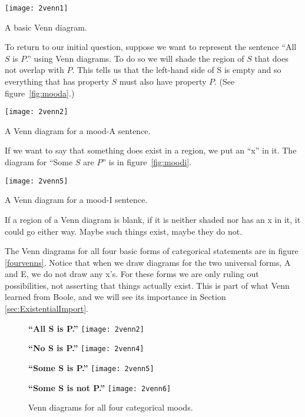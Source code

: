 \begin{marginfigure}
\texttt{[image: 2venn1]}
\caption{A basic Venn diagram.}
\label{fig:basicvenn}
\end{marginfigure}

To return to our initial question, suppose we want to represent the sentence ``All $S$ is $P$.'' using Venn diagrams. To do so we will shade the region of $S$ that does not overlap with $P$. This tells us that the left-hand side of S is empty and so everything that has property $S$ must also have property $P$. (See figure~\ref{fig:mooda}.)

\begin{marginfigure}
\texttt{[image: 2venn2]}
\caption{A Venn diagram for a mood-A sentence.}
\label{fig:mooda}
\end{marginfigure}

If we want to say that something does exist in a region, we put an ``x'' in it. The diagram for ``Some $S$ are $P$'' is in figure~\ref{fig:moodi}.

\begin{marginfigure}
\texttt{[image: 2venn5]}
\caption{A Venn diagram for a mood-I sentence.}
\label{fig:moodi}
\end{marginfigure}


If a region of a Venn diagram is blank, if it is neither shaded nor has an x in it, it could go either way. Maybe such things exist, maybe they do not.

The Venn diagrams for all four basic forms of categorical statements are in figure \ref{fourvenns}. Notice that when we draw diagrams for the two universal forms, A and E, we do not draw any x's. For these forms we are only ruling out possibilities, not asserting that things actually exist. This is part of what Venn learned from Boole, and we will see its importance in Section \ref{sec:ExistentialImport}.

\begin{figure}[!ht]
\begin{minipage}[t]{0.4\textwidth}\centering
    \textbf{``All S is P.''}
\texttt{[image: 2venn2]}
\end{minipage}\hspace{1cm}
\begin{minipage}[t]{0.4\textwidth}\centering
    \textbf{``No S is P.''}
\texttt{[image: 2venn4]}
\end{minipage}

\vspace{1cm}

\begin{minipage}[t]{0.4\textwidth}\centering
    \textbf{``Some S is P.''}
\texttt{[image: 2venn5]}
\end{minipage}\hspace{1cm}
\begin{minipage}[t]{0.4\textwidth}\centering
    \textbf{``Some S is not P.''}
\texttt{[image: 2venn6]}
\end{minipage}

\vspace{1cm}

\caption{Venn diagrams for all four categorical moods.}
\label{fig:fourvenns}
\end{figure}



